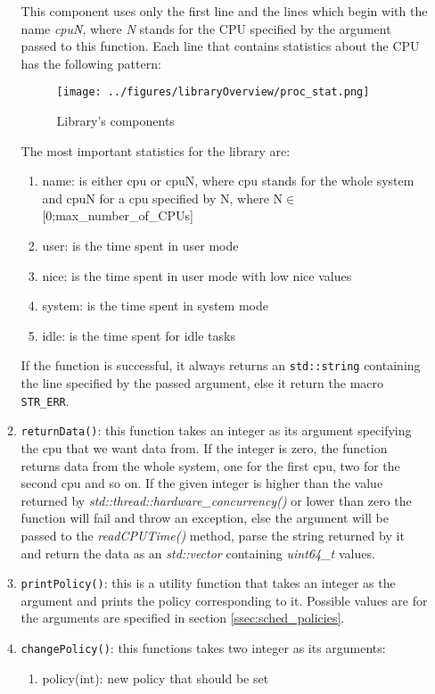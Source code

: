 \begin{enumerate}
\begin{enumerate}
		This component uses only the first line and the lines which begin with the name \textit{cpuN}, where \textit{N} stands for the CPU specified by the argument passed to this function. Each line that contains statistics about the CPU has the following pattern\cite{linux-man-proc}:
		\begin{figure}[!htb]
			\centering
			\texttt{[image: ../figures/libraryOverview/proc\_stat.png]}
			\caption{Library's components}
		\end{figure}
		The most important statistics for the library are\cite{linux-man-proc}:
		\begin{enumerate}
			\item name: is either cpu or cpuN, where cpu stands for the whole system and cpuN for a cpu specified by N, where N$\in$ [0;max\_number\_of\_CPUs]
			\item user: is the time spent in user mode
			\item nice: is the time spent in user mode with low nice values
			\item system: is the time spent in system mode
			\item idle: is the time spent for idle tasks
		\end{enumerate}
			If the function is successful, it always returns an \texttt{std::string} containing the line specified by the passed argument, else it return the macro \texttt{STR\_ERR}.
		\item \texttt{returnData()}: this function takes an integer as its argument specifying the cpu that we want data from. If the integer is zero, the function returns data from the whole system, one for the first cpu, two for the second cpu and so on. If the given integer is higher than the value returned by \textit{std::thread::hardware\_concurrency()} or lower than zero the function will fail and throw an exception, else the argument will be passed to the \textit{readCPUTime()} method, parse the string returned by it and return the data as an \textit{std::vector} containing \textit{uint64\_t} values.
		\item \texttt{printPolicy()}: this is a utility function that takes an integer as the argument and prints the policy corresponding to it. Possible values are for the arguments are specified in section \ref{ssec:sched_policies}.
		\item \texttt{changePolicy()}: this functions takes two integer as its arguments:
		\begin{enumerate}
			\item policy(int): new policy that should be set

\end{enumerate}
\end{enumerate}
\end{enumerate}
